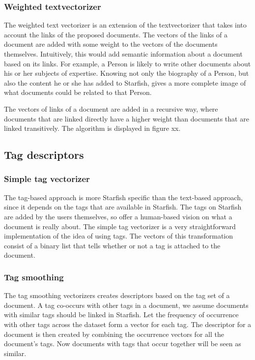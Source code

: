 \subsubsection{Weighted textvectorizer}
The weighted text vectorizer is an extension of the textvectorizer that takes
into account the links of the proposed documents. The vectors of the links of a
document are added with some weight to the vectors of the documents themselves.
Intuitively, this would add semantic information about a document based on its
links. For example, a Person is likely to write other documents about his or
her subjects of expertise. Knowing not only the biography of a Person, but also
the content he or she has added to Starfish, gives a more complete image of
what documents could be related to that Person.

The vectors of links of a document are added in a recursive way, where
documents that are linked directly have a higher weight than documents that are
linked transitively. The algorithm is displayed in figure xx.

\subsection{Tag descriptors}
\subsubsection{Simple tag vectorizer}
The tag-based approach is more Starfish specific than the text-based approach,
since it depends on the tags that are available in Starfish. The tags on
Starfish are added by the users themselves, so offer a human-based vision on
what a document is really about. The simple tag vectorizer is a very
straightforward implementation of the idea of using tags. The vectors of this
transformation consist of a binary list that tells whether or not a tag is
attached to the document. 

\subsubsection{Tag smoothing}
The tag smoothing vectorizers creates descriptors based on the tag set of a
document. A tag co-occurs with other tags in a document, we assume documents
with similar tags should be linked in Starfish. Let the frequency of occurrence
with other tags across the dataset form a vector for each tag. The
descriptor for a document is then created by combining the occurrence vectors
for all the document's tags. Now documents with tags that occur together will
be seen as similar.

